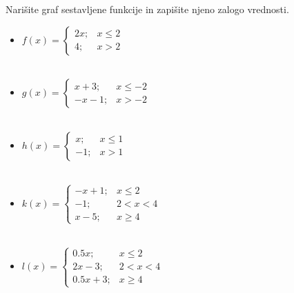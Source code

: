             \begin{naloga}
                Narišite graf sestavljene funkcije in zapišite njeno zalogo vrednosti.
                    \begin{multicols}{2}
                    \begin{itemize}
                        \item $f(x)=\begin{cases}
                            2x; & x\leq 2 \\ 4; &x>2
                        \end{cases}$ \\~
                        \item $g(x)=\begin{cases}
                            x+3; & x\leq -2 \\ -x-1; &x>-2
                        \end{cases}$ \\~
                        \item $h(x)=\begin{cases}
                            x; & x\leq 1 \\ -1; & x>1
                        \end{cases}$ \\~
                        \item $k(x)=\begin{cases}
                            -x+1; & x\leq 2 \\ -1; &2<x<4 \\ x-5; &x\geq 4
                        \end{cases}$ \\~
                        \item $l(x)=\begin{cases}
                            0.5x; & x\leq 2 \\ 2x-3; &2<x<4 \\ 0.5x+3; &x\geq 4
                        \end{cases}$ \\~
                    \end{itemize}
                \end{multicols}
        \end{naloga}


